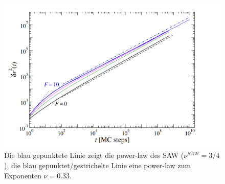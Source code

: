 \documentclass[a4paper, 12pt]{scrartcl}
\begin{document}
\begin{figure}[h!]
	\centering
	\includegraphics[scale=0.5]{food_thomas.png}
	\caption{Die blau gepunktete Linie zeigt die power-law des SAW ($\nu^{SAW}=3/4$), die blau gepunktet/gestrichelte Linie eine power-law zum Exponenten $\nu = 0.33$.}
\end{figure}
\end{document}
